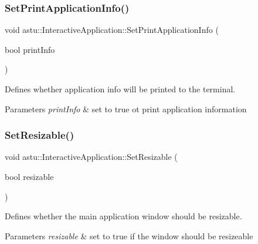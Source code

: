 \subsubsection{\texorpdfstring{Set\+Print\+Application\+Info()}{SetPrintApplicationInfo()}}
{\footnotesize\ttfamily void astu\+::\+Interactive\+Application\+::\+Set\+Print\+Application\+Info (\begin{DoxyParamCaption}\item[{bool}]{print\+Info }\end{DoxyParamCaption})}

Defines whether application info will be printed to the terminal.


\begin{DoxyParams}{Parameters}
{\em print\+Info} & set to {\ttfamily true} ot print application information \\
\hline
\end{DoxyParams}
\mbox{\label{classastu_1_1InteractiveApplication_abc17507b3921d5dbc0b5c1648d0b1019}} 
\subsubsection{\texorpdfstring{Set\+Resizable()}{SetResizable()}}
{\footnotesize\ttfamily void astu\+::\+Interactive\+Application\+::\+Set\+Resizable (\begin{DoxyParamCaption}\item[{bool}]{resizable }\end{DoxyParamCaption})}

Defines whether the main application window should be resizable.


\begin{DoxyParams}{Parameters}
{\em resizable} & set to {\ttfamily true} if the window should be resizeable \\
\hline
\end{DoxyParams}
\mbox{\label{classastu_1_1InteractiveApplication_a6ced923e49633396d674674630b2c096}} 
